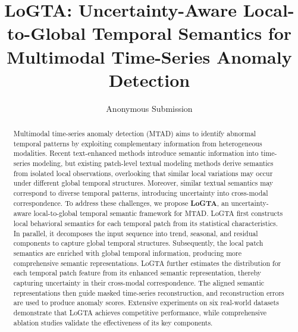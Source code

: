 \documentclass[letterpaper]{article} %
\title{LoGTA: Uncertainty-Aware Local-to-Global Temporal Semantics for Multimodal Time-Series Anomaly Detection}
\author{
    Anonymous Submission
}
\begin{document}
\maketitle

\begin{abstract}
Multimodal time-series anomaly detection (MTAD) aims to identify abnormal temporal patterns by exploiting complementary information from heterogeneous modalities. 
Recent text-enhanced methods introduce semantic information into time-series modeling, but existing patch-level textual modeling methods derive semantics from isolated local observations, overlooking that similar local variations may occur under different global temporal structures.  
Moreover, similar textual semantics may correspond to diverse temporal patterns, introducing uncertainty into cross-modal correspondence. 
To address these challenges, we propose \textbf{LoGTA}, an uncertainty-aware local-to-global temporal semantic framework for MTAD. 
LoGTA first constructs local behavioral semantics for each temporal patch from its statistical characteristics. 
In parallel, it decomposes the input sequence into trend, seasonal, and residual components to capture global temporal structures. Subsequently, the local patch semantics are enriched with global temporal information, producing more comprehensive semantic representations. LoGTA further estimates the distribution for each temporal patch feature from its enhanced semantic representation, thereby capturing uncertainty in their cross-modal correspondence. The aligned semantic representations then guide masked time-series reconstruction, and reconstruction errors are used to produce anomaly scores. Extensive experiments on six real-world datasets demonstrate that LoGTA achieves competitive performance, while comprehensive ablation studies validate the effectiveness of its key components.
\end{abstract}

\end{document}
